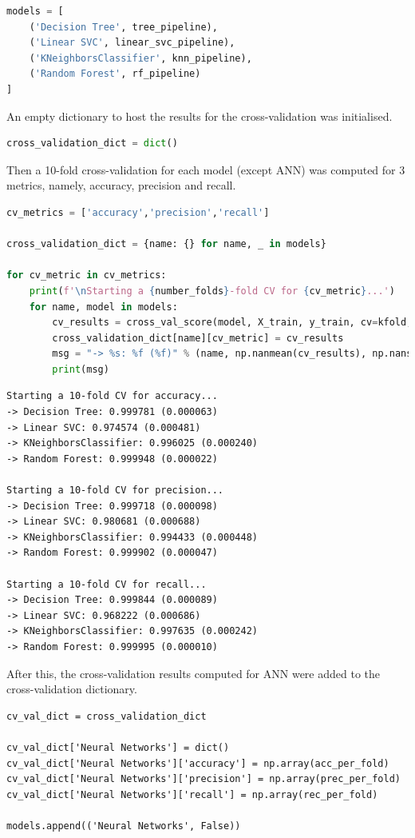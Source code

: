 \documentclass{article}
\begin{document}
\begin{lstlisting}[language=Python]
models = [    
    ('Decision Tree', tree_pipeline),
    ('Linear SVC', linear_svc_pipeline),
    ('KNeighborsClassifier', knn_pipeline),    
    ('Random Forest', rf_pipeline)
]
\end{lstlisting}

An empty dictionary to host the results for the cross-validation was initialised.
\begin{lstlisting}[language=Python]
cross_validation_dict = dict()
\end{lstlisting}

Then a 10-fold cross-validation for each model (except ANN) was computed for 3 metrics, namely, accuracy, precision and recall.

\begin{lstlisting}[language=Python]
cv_metrics = ['accuracy','precision','recall']

cross_validation_dict = {name: {} for name, _ in models}

for cv_metric in cv_metrics:
    print(f'\nStarting a {number_folds}-fold CV for {cv_metric}...')
    for name, model in models:
        cv_results = cross_val_score(model, X_train, y_train, cv=kfold, scoring=cv_metric)
        cross_validation_dict[name][cv_metric] = cv_results
        msg = "-> %s: %f (%f)" % (name, np.nanmean(cv_results), np.nanstd(cv_results))        
        print(msg)   
\end{lstlisting}
\begin{verbatim}
Starting a 10-fold CV for accuracy...
-> Decision Tree: 0.999781 (0.000063)
-> Linear SVC: 0.974574 (0.000481)
-> KNeighborsClassifier: 0.996025 (0.000240)
-> Random Forest: 0.999948 (0.000022)

Starting a 10-fold CV for precision...
-> Decision Tree: 0.999718 (0.000098)
-> Linear SVC: 0.980681 (0.000688)
-> KNeighborsClassifier: 0.994433 (0.000448)
-> Random Forest: 0.999902 (0.000047)

Starting a 10-fold CV for recall...
-> Decision Tree: 0.999844 (0.000089)
-> Linear SVC: 0.968222 (0.000686)
-> KNeighborsClassifier: 0.997635 (0.000242)
-> Random Forest: 0.999995 (0.000010)
\end{verbatim}

After this, the cross-validation results computed for ANN were added to the cross-validation dictionary.

\begin{lstlisting}
cv_val_dict = cross_validation_dict

cv_val_dict['Neural Networks'] = dict()
cv_val_dict['Neural Networks']['accuracy'] = np.array(acc_per_fold)
cv_val_dict['Neural Networks']['precision'] = np.array(prec_per_fold)
cv_val_dict['Neural Networks']['recall'] = np.array(rec_per_fold)    

models.append(('Neural Networks', False))
\end{lstlisting}
\end{document}
